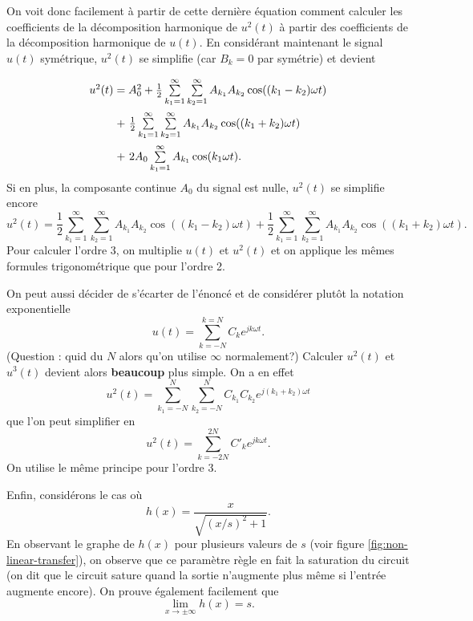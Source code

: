 On voit donc facilement à partir de cette dernière équation comment calculer
les coefficients de la décomposition harmonique de $u^2(t)$ à partir des
coefficients de la décomposition harmonique de $u(t)$. En considérant
maintenant le signal $u(t)$ symétrique, $u^2(t)$ se simplifie
(car $B_k = 0$ par symétrie) et devient
\[\arraycolsep=1.4pt\def\arraystretch{2.2}
	\begin{array}{cl}
		u^2(t) 	&= A^2_0 + \frac{1}{2}\sum\limits_{k_1=1}^\infty\sum\limits_{k_2=1}^\infty A_{k_1}A_{k_2}\cos((k_1-k_2)\omega t)\\
						&+~ \frac{1}{2}\sum\limits_{k_1=1}^\infty\sum\limits_{k_2=1}^\infty A_{k_1}A_{k_2}\cos((k_1+k_2)\omega t) \\
						&+~ 2A_0\sum\limits_{k_1=1}^\infty A_{k_1}\cos(k_1\omega t).
	\end{array}
\]
Si en plus, la composante continue $A_0$ du signal est nulle,
$u^2(t)$ se simplifie encore
\[ u^2(t) = \frac{1}{2}\sum\limits_{k_1=1}^\infty\sum\limits_{k_2=1}^\infty A_{k_1}A_{k_2}\cos((k_1-k_2)\omega t)
+ \frac{1}{2}\sum\limits_{k_1=1}^\infty\sum\limits_{k_2=1}^\infty A_{k_1}A_{k_2}\cos((k_1+k_2)\omega t). \]
Pour calculer l'ordre 3, on multiplie $u(t)$ et $u^2(t)$ et on applique
les mêmes formules trigonométrique que pour l'ordre 2.

\begin{correction}
	On peut aussi décider de s'écarter de l'énoncé et de
	considérer plutôt la notation exponentielle
	\[ u(t) = \sum_{k=-N}^{k=N} C_ke^{jk\omega t}.\]
	(Question : quid du $N$ alors qu'on utilise $\infty$ normalement?)
	Calculer $u^2(t)$ et $u^3(t)$ devient alors \textbf{beaucoup}
	plus simple. On a en effet
	\[ u^2(t) = \sum_{k_1=-N}^N\sum_{k_2=-N}^N C_{k_1}C_{k_2}e^{j(k_1+k_2)\omega t}\]
	que l'on peut simplifier en
	\[ u^2(t) = \sum_{k=-2N}^{2N}C'_ke^{jk\omega t}.\]
	On utilise le même principe pour l'ordre 3.
\end{correction}

Enfin, considérons le cas où 
\[ h(x) = \frac{x}{\sqrt{(x/s)^2+1}}.\]
En observant le graphe de $h(x)$ pour plusieurs
valeurs de $s$ (voir figure \ref{fig:non-linear-transfer}),
on observe que ce paramètre règle en fait la saturation du circuit
(on dit que le circuit sature quand la sortie n'augmente plus
même si l'entrée augmente encore). 
On prouve également facilement que
\[ \lim_{x\to\pm\infty} h(x) = s.\]

